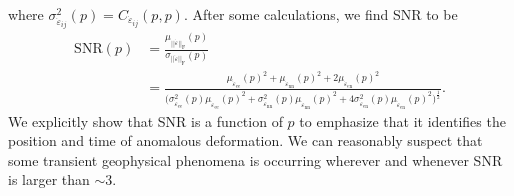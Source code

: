 \documentclass[extra,mreferee]{gji}
\begin{document}
where $\sigma^2_{\dot\varepsilon_{ij}}(p) = C_{\dot\varepsilon_{ij}}(p,p)$. After some calculations, we find SNR to be
\begin{align}\label{eq:SNR}
\mathrm{SNR}(p) &= \frac{\mu_{||\dot\varepsilon||_\mathrm{F}}(p)}{\sigma_{||\dot\varepsilon||_\mathrm{F}}(p)} \\
                &= \frac{\mu_{\dot\varepsilon_\mathrm{ee}}(p)^2 +
                        \mu_{\dot\varepsilon_\mathrm{nn}}(p)^2 +
                        2\mu_{\dot\varepsilon_\mathrm{en}}(p)^2}
                       {\big(\sigma^2_{\dot\varepsilon_\mathrm{ee}}(p)\mu_{\dot\varepsilon_\mathrm{ee}}(p)^2 + 
                             \sigma^2_{\dot\varepsilon_\mathrm{nn}}(p)\mu_{\dot\varepsilon_\mathrm{nn}}(p)^2 + 
                              4\sigma^2_{\dot\varepsilon_\mathrm{en}}(p)\mu_{\dot\varepsilon_\mathrm{en}}(p)^2
                        \big)^{\frac{1}{2}}}
.
\end{align}
We explicitly show that SNR is a function of $p$ to emphasize that it identifies the position and time of anomalous deformation. We can reasonably suspect that some transient geophysical phenomena is occurring wherever and whenever SNR is larger than ${\sim}3$.  
\end{document}
